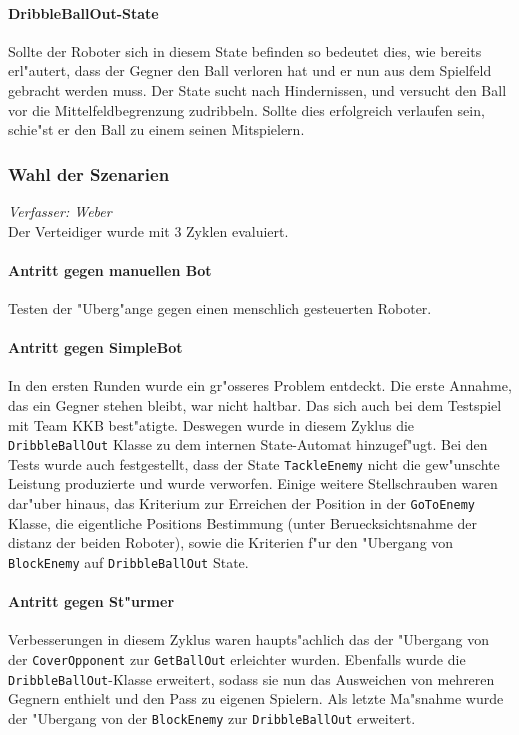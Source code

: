 \paragraph{DribbleBallOut-State}
Sollte der Roboter sich in diesem State befinden so bedeutet dies, wie bereits erl"autert, dass der Gegner den Ball verloren hat und er nun aus dem Spielfeld gebracht werden muss. Der State sucht nach Hindernissen, und versucht den Ball vor die Mittelfeldbegrenzung zudribbeln. Sollte dies erfolgreich verlaufen sein, schie"st er den Ball zu einem seinen Mitspielern.

\subsubsection{Wahl der Szenarien}
\textit{Verfasser: Weber}\\
Der Verteidiger wurde mit 3 Zyklen evaluiert.

\paragraph{Antritt gegen manuellen Bot}
Testen der "Uberg"ange gegen einen menschlich gesteuerten Roboter.

\paragraph{Antritt gegen SimpleBot}
In den ersten Runden wurde ein gr"osseres Problem entdeckt. Die erste Annahme, das ein Gegner stehen bleibt, war nicht haltbar. Das sich auch bei dem Testspiel mit Team KKB best"atigte. Deswegen wurde in diesem Zyklus die \lstinline{DribbleBallOut} Klasse zu dem internen State-Automat hinzugef"ugt. Bei den Tests wurde auch festgestellt, dass der State \lstinline{TackleEnemy} nicht die gew"unschte Leistung produzierte und wurde verworfen. Einige weitere Stellschrauben waren dar"uber hinaus, das Kriterium zur Erreichen der Position in der \lstinline{GoToEnemy} Klasse, die eigentliche Positions Bestimmung (unter Beruecksichtsnahme der distanz der beiden Roboter), sowie die Kriterien f"ur den "Ubergang von \lstinline{BlockEnemy} auf \lstinline{DribbleBallOut} State.

\paragraph{Antritt gegen St"urmer}
Verbesserungen in diesem Zyklus waren haupts"achlich das der "Ubergang von der \lstinline{CoverOpponent} zur \lstinline{GetBallOut} erleichter wurden. Ebenfalls wurde die \lstinline{DribbleBallOut}-Klasse erweitert, sodass sie nun das Ausweichen von mehreren Gegnern enthielt und den Pass zu eigenen Spielern. Als letzte Ma"snahme wurde der "Ubergang von der \lstinline{BlockEnemy} zur \lstinline{DribbleBallOut} erweitert.



